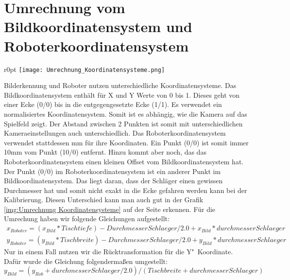 \section{Umrechnung vom Bildkoordinatensystem und Roboterkoordinatensystem}

\begin{wrapfigure}{r}{0pt}
	\texttt{[image: Umrechnung\_Koordinatensysteme.png]}
	\vspace{-15pt}
	\caption{ Veranschaulichung der Koordinatensystemunterschiede}
	\label{img:Umrechnung Koordinatensysteme}
\end{wrapfigure}

Bilderkennung und Roboter nutzen unterschiedliche Koordinatensysteme. Das Bildkoordinatensystem enthält für X und Y Werte von 0 bis 1. Dieses geht von einer Ecke (0/0) bis in die entgegengesetzte Ecke (1/1). Es verwendet ein normalisiertes Koordinatensystem. Somit ist es abhängig, wie die Kamera auf das Spielfeld zeigt. Der Abstand zwischen 2 Punkten ist somit mit unterschiedlichen Kameraeinstellungen auch unterschiedlich. Das Roboterkoordinatensystem verwendet stattdessen mm für ihre Koordinaten. Ein Punkt (0/0) ist somit immer 10mm vom Punkt (10/0) entfernt. Hinzu kommt aber noch, das das Roboterkoordinatensystem einen kleinen Offset vom Bildkoordinatensystem hat. Der Punkt (0/0) im Roboterkoordinatensystem ist ein anderer Punkt im Bildkoordinatensystem. Das liegt daran, dass der Schläger einen gewissen Durchmesser hat und somit nicht exakt in die Ecke gefahren werden kann bei der Kalibrierung. Diesen Unterschied kann man auch gut in der Grafik \ref{img:Umrechnung Koordinatensysteme} auf der Seite \pageref{img:Umrechnung Koordinatensysteme} erkennen. Für die Umrechung haben wir folgende Gleichungen aufgestellt:\\
$
\begin{array}{c}
x_{Roboter} = (x_{Bild} * Tischtiefe) - Durchmesser Schlaeger / 2.0 + x_{Bild} * durchmesserSchlaeger \\
y_{Roboter} = (y_{Bild} * Tischbreite) - Durchmesser Schlaeger / 2.0 + y_{Bild} * durchmesserSchlaeger
\end{array}
$\\
Nur in einem Fall nutzen wir die Rücktransformation für die Y"~Koordinate. Dafür wurde die Gleichung folgendermaßen umgestellt:\\
$y_{Bild} = (y_{Rob} + durchmesserSchlaeger / 2.0) / (Tischbreite +  durchmesserSchlaeger)$ 
